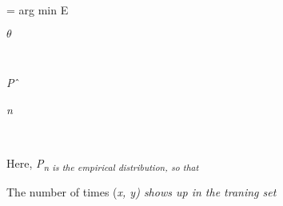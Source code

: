 \documentclass[12pt,twoside]{article}
\begin{document}
\begin{adjustwidth}{3.65in}{0.0in}
\par

\end{adjustwidth}


\vspace{\baselineskip}
\begin{multicols}{3}
{\fontsize{10pt}{12.0pt}\selectfont = arg min E\par}\par

\begin{FlushRight}
{\fontsize{7pt}{8.4pt}\selectfont \textit{$ \theta $ }\par}
\end{FlushRight}\par

\begin{FlushLeft}
\\
{\fontsize{7pt}{8.4pt}\selectfont \textit{P}$ \string^ $ {\fontsize{6pt}{7.2pt}\selectfont \textit{n}\par}\par}
\end{FlushLeft}\par

\begin{FlushLeft}
\\
{\fontsize{10pt}{12.0pt}\par}
\end{FlushLeft}\par


\vspace{\baselineskip}

\end{multicols}
\begin{adjustwidth}{0.58in}{0.0in}
{\fontsize{10pt}{12.0pt}\selectfont Here, \textit{P\textsubscript{n is the empirical distribution, so that}}\par}\par

\end{adjustwidth}

\begin{adjustwidth}{2.48in}{0.0in}
{\fontsize{10pt}{12.0pt}\selectfont The number of times (\textit{x, y) shows up in the traning set}\par}\par

\end{adjustwidth}
\end{document}
